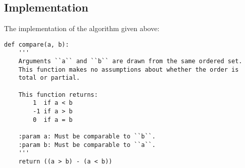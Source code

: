 \documentclass[11pt]{article}
\begin{document}
\subsection{Implementation}
\label{sec-1-2}
The implementation of the algorithm given above:

\lstset{language=Python,label= ,caption= ,numbers=none}
\begin{lstlisting}
def compare(a, b):
    '''
    Arguments ``a`` and ``b`` are drawn from the same ordered set.
    This function makes no assumptions about whether the order is
    total or partial.

    This function returns:
        1  if a < b
        -1 if a > b
        0  if a = b

    :param a: Must be comparable to ``b``.
    :param b: Must be comparable to ``a``.
    '''
    return ((a > b) - (a < b))
\end{lstlisting}
\end{document}
